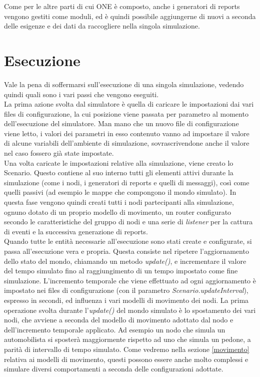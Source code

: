 Come per le altre parti di cui ONE è composto, anche i generatori di reports vengono gestiti come moduli, ed è quindi possibile aggiungerne di nuovi a seconda delle esigenze e dei dati da raccogliere nella singola simulazione.


\section{Esecuzione}
\label{esecuzioneONE}
Vale la pena di soffermarsi sull'esecuzione di una singola simulazione, vedendo quindi quali sono i vari passi che vengono eseguiti.
\\

La prima azione svolta dal simulatore è quella di caricare le impostazioni dai vari files di configurazione, la cui posizione viene passata per parametro al momento dell'esecuzione del simulatore. Man mano che un nuovo file di configurazione viene letto, i valori dei parametri in esso contenuto vanno ad impostare il valore di alcune variabili dell'ambiente di simulazione, sovrascrivendone anche il valore nel caso fossero già state impostate.
\\

Una volta caricate le impostazioni relative alla simulazione, viene creato lo Scenario. Questo contiene al suo interno tutti gli elementi attivi durante la simulazione (come i nodi, i generatori di reports e quelli di messaggi), così come quelli passivi (ad esempio le mappe che compongono il mondo simulato). In questa fase vengono quindi creati tutti i nodi partecipanti alla simulazione, ognuno dotato di un proprio modello di movimento, un router configurato secondo le caratteristiche del gruppo di nodi e una serie di \textit{listener} per la cattura di eventi e la successiva generazione di reports.
\\

Quando tutte le entità necessarie all'esecuzione sono stati create e configurate, si passa all'esecuzione vera e propria.
Questa consiste nel ripetere l'aggiornamento dello stato del mondo, chiamando un metodo \textit{update()}, e incrementare il valore del tempo simulato fino al raggiungimento di un tempo impostato come fine simulazione. L'incremento temporale che viene effettuato ad ogni aggiornamento è impostato nei files di configurazione (con il parametro \textit{Scenario.updateInterval}), espresso in secondi, ed influenza i vari modelli di movimento dei nodi. La prima operazione svolta durante l'\textit{update()} del mondo simulato è lo spostamento dei vari nodi, che avviene a seconda del modello di movimento adottato dal nodo e dell'incremento temporale applicato. Ad esempio un nodo che simula un automobilista si sposterà maggiormente rispetto ad uno che simula un pedone, a parità di intervallo di tempo simulato. Come vedremo nella sezione \ref{movimento} relativa ai modelli di movimento, questi possono essere anche molto complessi e simulare diversi comportamenti a seconda delle configurazioni adottate.
\\

